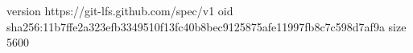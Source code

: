 version https://git-lfs.github.com/spec/v1
oid sha256:11b7ffe2a323efb3349510f13fc40b8bec9125875afe11997fb8c7c598d7af9a
size 5600
